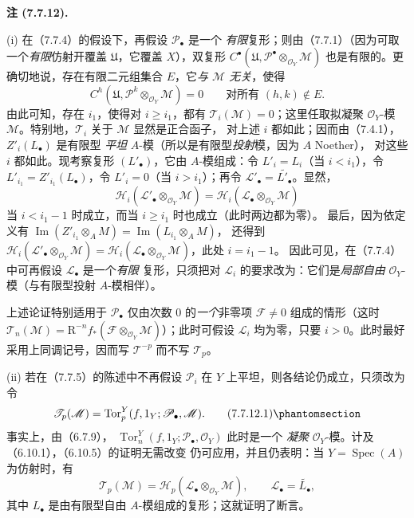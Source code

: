 \documentclass[UTF8,fontset=none,11pt,oneside,openany]{ctexbook}
\newenvironment{remarks}[1][]{%
  \par\medskip\noindent\textbf{注 (#1).}\ %
}{\par}
\let\EGAOriginalLabel\label
\renewcommand{\label}[1]{\phantomsection\EGAOriginalLabel{#1}}
\begin{document}
\begin{remarks}[7.7.12]
\textnormal{(i)} 在（7.7.4）的假设下，再假设 $\mathscr P_\bullet$ 是一个
\emph{有限}复形；则由（7.7.1）（因为可取一个\emph{有限}仿射开覆盖
$\mathfrak U$，它覆盖 $X$），双复形
$C^\bullet(\mathfrak U,\mathscr P^\bullet\otimes_{\mathscr O_Y}\mathscr M)$
也是有限的。更确切地说，存在有限二元组集合 $E$，它\emph{与 $\mathscr M$
无关}，使得
\[
  C^h(\mathfrak U,\mathscr P^k\otimes_{\mathscr O_Y}\mathscr M)=0
  \qquad\text{对所有 }(h,k)\notin E.
\]
由此可知，存在 $i_1$，使得对 $i\geq i_1$，都有
$\mathscr T_i(\mathscr M)=0$；这里任取拟凝聚 $\mathscr O_Y$-模
$\mathscr M$。特别地，$\mathscr T_i$ 关于 $\mathscr M$ 显然是正合函子，
对上述 $i$ 都如此；因而由（7.4.1），$Z'_i(L_\bullet)$ 是有限型
\emph{平坦} $A$-模（所以是有限型\emph{投射}模，因为 $A$ Noether），
对这些 $i$ 都如此。现考察复形 $(L'_\bullet)$，它由 $A$-模组成：令
$L'_i=L_i$（当 $i<i_1$），令 $L'_{i_1}=Z'_{i_1}(L_\bullet)$，令
$L'_i=0$（当 $i>i_1$）；再令
$\mathscr L'_\bullet=\widetilde{L'_\bullet}$。显然，
\[
  \mathscr H_i(\mathscr L'_\bullet\otimes_{\mathscr O_Y}\mathscr M)
  =
  \mathscr H_i(\mathscr L_\bullet\otimes_{\mathscr O_Y}\mathscr M)
\]
当 $i<i_1-1$ 时成立，而当 $i\geq i_1$ 时也成立（此时两边都为零）。
最后，因为依定义有
$\operatorname{Im}(Z'_{i_1}\otimes_A M)=\operatorname{Im}(L_{i_1}\otimes_A M)$，
还得到
$\mathscr H_i(\mathscr L'_\bullet\otimes_{\mathscr O_Y}\mathscr M)
=\mathscr H_i(\mathscr L_\bullet\otimes_{\mathscr O_Y}\mathscr M)$，此处
$i=i_1-1$。
因此可见，在（7.7.4）中可再假设 $\mathscr L_\bullet$ 是一个\emph{有限}
复形，只须把对 $\mathscr L_i$ 的要求改为：它们是\emph{局部自由}
$\mathscr O_Y$-模（与有限型投射 $A$-模相伴）。

上述论证特别适用于 $\mathscr P_\bullet$ 仅由次数 0 的\emph{一个}非零项
$\mathscr F\ne0$ 组成的情形（这时
$\mathscr T_n(\mathscr M)=\mathrm R^{-n}f_*
(\mathscr F\otimes_{\mathscr O_Y}\mathscr M)$）；此时可假设 $\mathscr L_i$
均为零，只要 $i>0$。此时最好采用上同调记号，因而写
$\mathscr T^{-p}$ 而不写 $\mathscr T_p$。

\medskip
\textnormal{(ii)} 若在（7.7.5）的陈述中不再假设 $\mathscr P_i$ 在 $Y$
上平坦，则各结论仍成立，只须改为令
\[
  \mathscr T_p(\mathscr M)
  =
  \operatorname{Tor}^Y_p
    (f,1_Y;\mathscr P_\bullet,\mathscr M).
  \tag{7.7.12.1}\label{III.7.7.12.1.fr}
\]
事实上，由（6.7.9），
$\operatorname{Tor}^Y_n(f,1_Y;\mathscr P_\bullet,\mathscr O_Y)$ 此时是一个
\emph{凝聚} $\mathscr O_Y$-模。计及（6.10.1），（6.10.5）的证明无需改变
仍可应用，并且仍表明：当 $Y=\operatorname{Spec}(A)$ 为仿射时，有
\[
  \mathscr T_p(\mathscr M)
  =
  \mathscr H_p(\mathscr L_\bullet\otimes_{\mathscr O_Y}\mathscr M),
  \qquad
  \mathscr L_\bullet=\widetilde{L_\bullet},
\]
其中 $L_\bullet$ 是由有限型自由 $A$-模组成的复形；这就证明了断言。
\end{remarks}
\end{document}
